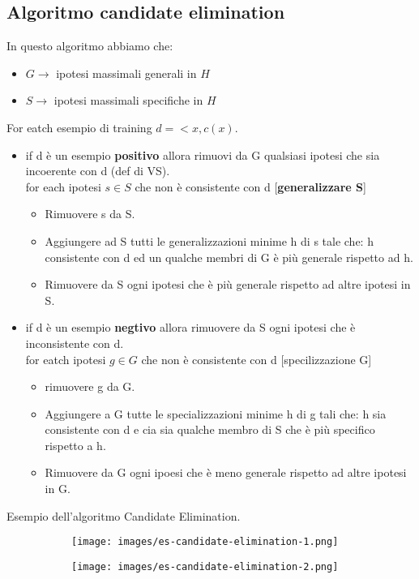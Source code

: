 \subsection{Algoritmo candidate elimination}
In questo algoritmo abbiamo che:
\begin{itemize}
    \item $G \to$ ipotesi massimali generali in $H$
    \item $S \to$ ipotesi massimali specifiche in $H$
\end{itemize}
For eatch esempio di training $d = <x, c(x)$.
\begin{itemize}
    \item if d è un esempio \textbf{positivo} allora rimuovi da G qualsiasi ipotesi che sia incoerente con d (def di VS).\\
    for each ipotesi $s \in S$ che non è consistente con d [\textbf{generalizzare S}]
    \begin{itemize}
        \item Rimuovere s da S.
        \item Aggiungere ad S tutti le generalizzazioni minime h di s tale che: h consistente con d ed un qualche membri di G è più generale rispetto ad h.
        \item Rimuovere da S ogni ipotesi che è più generale rispetto ad altre ipotesi in S.
    \end{itemize}
    \item if d è un esempio \textbf{negtivo} allora rimuovere da S ogni ipotesi che è inconsistente con d.\\
    for eatch ipotesi $g \in G$ che non è consistente con d [specilizzazione G]
    \begin{itemize}
        \item rimuovere g da G.
        \item Aggiungere a G tutte le specializzazioni minime h di g tali che: h sia consistente con d e cia sia qualche membro di S che è più specifico rispetto a h.
        \item Rimuovere da G ogni ipoesi che è meno generale rispetto ad altre ipotesi in G.
    \end{itemize}
\end{itemize}
\begin{example}
    Esempio dell'algoritmo Candidate Elimination.
    \begin{figure}[h!]
        \begin{subfigure}{0.45\textwidth}
            \centering
            \texttt{[image: images/es-candidate-elimination-1.png]}
        \end{subfigure}
        \hspace{10pt}
        \begin{subfigure}{0.45\textwidth}
            \centering
            \texttt{[image: images/es-candidate-elimination-2.png]}
        \end{subfigure}
    \end{figure}
\end{example}

